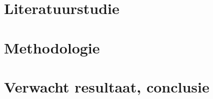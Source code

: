 \section{Literatuurstudie}%
\label{sec:literatuurstudie}


\section{Methodologie}%
\label{sec:methodologie}


\section{Verwacht resultaat, conclusie}%
\label{sec:verwachte_resultaten}
